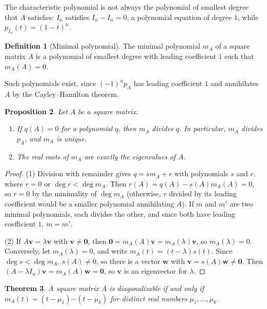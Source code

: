 \documentclass[11pt]{article}
\theoremstyle{definition}
\newtheorem{definition}{Definition}[section]
\theoremstyle{plain}
\newtheorem{theorem}[definition]{Theorem}
\newtheorem{proposition}[definition]{Proposition}
\theoremstyle{remark}
\begin{document}
The characteristic polynomial is not always the polynomial of smallest degree that $A$ satisfies: $I_n$ satisfies $I_n - I_n = 0$, a polynomial equation of degree $1$, while $p_{I_n}(t) = (1 - t)^n$.

\begin{definition}[Minimal polynomial]
    The minimal polynomial $m_A$ of a square matrix $A$ is a polynomial of smallest degree with leading coefficient $1$ such that $m_A(A) = 0$.
\end{definition}

Such polynomials exist, since $(-1)^np_A$ has leading coefficient $1$ and annihilates $A$ by the Cayley--Hamilton theorem.

\begin{proposition}\label{prop:minimal-polynomial}
    Let $A$ be a square matrix.
    \begin{enumerate}
        \item If $q(A) = 0$ for a polynomial $q$, then $m_A$ divides $q$. In particular, $m_A$ divides $p_A$, and $m_A$ is unique.
        \item The real roots of $m_A$ are exactly the eigenvalues of $A$.
    \end{enumerate}
\end{proposition}

\begin{proof}
    (1) Division with remainder gives $q = sm_A + r$ with polynomials $s$ and $r$, where $r = 0$ or $\deg r < \deg m_A$. Then $r(A) = q(A) - s(A)m_A(A) = 0$, so $r = 0$ by the minimality of $\deg m_A$ (otherwise, $r$ divided by its leading coefficient would be a smaller polynomial annihilating $A$). If $m$ and $m'$ are two minimal polynomials, each divides the other, and since both have leading coefficient $1$, $m = m'$.

    (2) If $A\mathbf{v} = \lambda\mathbf{v}$ with $\mathbf{v} \neq \mathbf{0}$, then $\mathbf{0} = m_A(A)\mathbf{v} = m_A(\lambda)\mathbf{v}$, so $m_A(\lambda) = 0$. Conversely, let $m_A(\lambda) = 0$, and write $m_A(t) = (t - \lambda)s(t)$. Since $\deg s < \deg m_A$, $s(A) \neq 0$, so there is a vector $\mathbf{w}$ with $\mathbf{v} = s(A)\mathbf{w} \neq \mathbf{0}$. Then $(A - \lambda I_n)\mathbf{v} = m_A(A)\mathbf{w} = \mathbf{0}$, so $\mathbf{v}$ is an eigenvector for $\lambda$.
\end{proof}

\begin{theorem}\label{thm:minimal-diagonalizable}
    A square matrix $A$ is diagonalizable if and only if $m_A(t) = (t - \mu_1) \cdots (t - \mu_k)$ for distinct real numbers $\mu_1, \ldots, \mu_k$.
\end{theorem}
\end{document}
